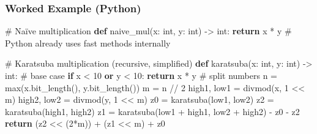 \documentclass[
  letterpaper,
  DIV=11,
  numbers=noendperiod]{scrreprt}
\newenvironment{Shaded}{\begin{snugshade}}{\end{snugshade}}
\newcommand{\BuiltInTok}[1]{\textcolor[rgb]{0.00,0.23,0.31}{#1}}
\newcommand{\CommentTok}[1]{\textcolor[rgb]{0.37,0.37,0.37}{#1}}
\newcommand{\ControlFlowTok}[1]{\textcolor[rgb]{0.00,0.23,0.31}{\textbf{#1}}}
\newcommand{\DecValTok}[1]{\textcolor[rgb]{0.68,0.00,0.00}{#1}}
\newcommand{\KeywordTok}[1]{\textcolor[rgb]{0.00,0.23,0.31}{\textbf{#1}}}
\newcommand{\NormalTok}[1]{\textcolor[rgb]{0.00,0.23,0.31}{#1}}
\newcommand{\OperatorTok}[1]{\textcolor[rgb]{0.37,0.37,0.37}{#1}}
\begin{document}
\subsubsection{Worked Example (Python)}\label{worked-example-python-3}

\begin{Shaded}
\begin{Highlighting}[]
\CommentTok{\# Naïve multiplication}
\KeywordTok{def}\NormalTok{ naive\_mul(x: }\BuiltInTok{int}\NormalTok{, y: }\BuiltInTok{int}\NormalTok{) }\OperatorTok{{-}\textgreater{}} \BuiltInTok{int}\NormalTok{:}
    \ControlFlowTok{return}\NormalTok{ x }\OperatorTok{*}\NormalTok{ y  }\CommentTok{\# Python already uses fast methods internally}

\CommentTok{\# Karatsuba multiplication (recursive, simplified)}
\KeywordTok{def}\NormalTok{ karatsuba(x: }\BuiltInTok{int}\NormalTok{, y: }\BuiltInTok{int}\NormalTok{) }\OperatorTok{{-}\textgreater{}} \BuiltInTok{int}\NormalTok{:}
    \CommentTok{\# base case}
    \ControlFlowTok{if}\NormalTok{ x }\OperatorTok{\textless{}} \DecValTok{10} \KeywordTok{or}\NormalTok{ y }\OperatorTok{\textless{}} \DecValTok{10}\NormalTok{:}
        \ControlFlowTok{return}\NormalTok{ x }\OperatorTok{*}\NormalTok{ y}
    \CommentTok{\# split numbers}
\NormalTok{    n }\OperatorTok{=} \BuiltInTok{max}\NormalTok{(x.bit\_length(), y.bit\_length())}
\NormalTok{    m }\OperatorTok{=}\NormalTok{ n }\OperatorTok{//} \DecValTok{2}
\NormalTok{    high1, low1 }\OperatorTok{=} \BuiltInTok{divmod}\NormalTok{(x, }\DecValTok{1} \OperatorTok{\textless{}\textless{}}\NormalTok{ m)}
\NormalTok{    high2, low2 }\OperatorTok{=} \BuiltInTok{divmod}\NormalTok{(y, }\DecValTok{1} \OperatorTok{\textless{}\textless{}}\NormalTok{ m)}
\NormalTok{    z0 }\OperatorTok{=}\NormalTok{ karatsuba(low1, low2)}
\NormalTok{    z2 }\OperatorTok{=}\NormalTok{ karatsuba(high1, high2)}
\NormalTok{    z1 }\OperatorTok{=}\NormalTok{ karatsuba(low1 }\OperatorTok{+}\NormalTok{ high1, low2 }\OperatorTok{+}\NormalTok{ high2) }\OperatorTok{{-}}\NormalTok{ z0 }\OperatorTok{{-}}\NormalTok{ z2}
    \ControlFlowTok{return}\NormalTok{ (z2 }\OperatorTok{\textless{}\textless{}}\NormalTok{ (}\DecValTok{2}\OperatorTok{*}\NormalTok{m)) }\OperatorTok{+}\NormalTok{ (z1 }\OperatorTok{\textless{}\textless{}}\NormalTok{ m) }\OperatorTok{+}\NormalTok{ z0}


\end{Highlighting}
\end{Shaded}
\end{document}
